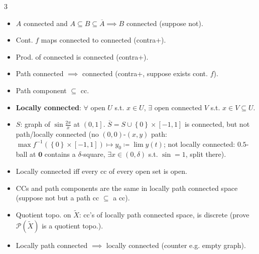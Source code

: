\documentclass[10pt]{article}
\begin{document}
\begin{multicols*}{3}
\begin{itemize}
            \item $A$ connected and $A \subseteq B \subseteq \overline{A} \implies B$ connected (suppose not).
            \item Cont. $f$ maps connected to connected (contra+).
            \item Prod. of connected is connected (contra+).
            \item Path connected $\implies$ connected (contra+, suppose exists cont. $f$).
            \item Path component $\subseteq $ cc.
            \item \textbf{Locally connected}: $\forall$ open $U$ s.t. $x \in U$, $\exists$ open connected $V$ s.t. $x \in V \subseteq U$.
            \item $S$: graph of $\sin\frac{2\pi}{x}$ at $\left(0, 1\right]$. $\overline{S} = S \cup \left\{0\right\} \times \left[-1, 1\right]$ is connected, but not path/locally connected (no $(0, 0)$-$(x, y)$ path: $\max f^{-1}(\left\{0\right\} \times [-1, 1]) \mapsto y_0 \coloneqq \lim y\left(t\right)$; not locally connected: $0.5$-ball at $\mathbf{0}$ contains a $\delta$-square, $\exists x \in (0, \delta)$ s.t. $\sin = 1$, split there).
            \item Locally connected iff every cc of every open set is open.
            \item CCs and path components are the same in locally path connected space (suppose not but a path cc $\subseteq$ a cc).
            \item Quotient topo. on $\tilde{X}$: cc's of locally path connected space, is discrete (prove $\mathcal{P}\left(\tilde{X}\right)$ is a quotient topo.).
            \item Locally path connected $\implies$ locally connected (counter e.g. empty graph).
        \end{itemize}
    \end{multicols*}
\end{document}
